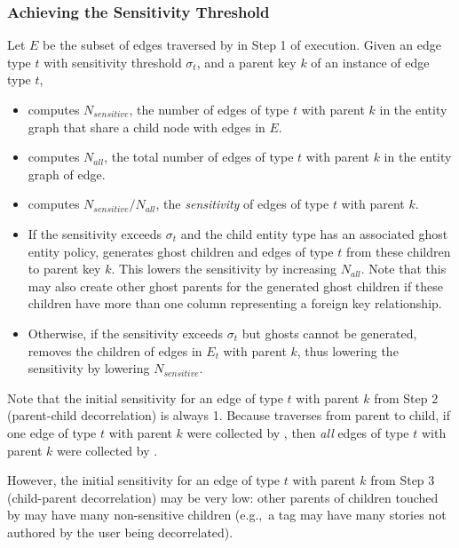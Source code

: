 \subsubsection{Achieving the Sensitivity Threshold}
\label{sensitivity_algo}
Let $E$ be the subset of edges traversed by \sys in Step 1 of execution. 
Given an edge type $t$ with sensitivity threshold $\sigma_t$, and a parent key $k$ of an instance of
edge type $t$, 
    \begin{itemize}
        \item \sys computes $N_{sensitive}$, the number of edges of type $t$ with parent $k$ in the entity graph that share 
            a child node with edges in $E$.
        \item \sys computes $N_{all}$, the total number of edges of type $t$ with parent $k$
            in the entity graph of edge.
        \item \sys computes $N_{sensitive}/N_{all}$, the \emph{sensitivity} of edges of type $t$
            with parent $k$.
        \item If the sensitivity exceeds $\sigma_t$ and the child entity type has an associated ghost entity policy, \sys
            generates ghost children and edges of type $t$ from these children to parent
            key $k$. This lowers the sensitivity by increasing $N_{all}$. Note that this may also
            create other ghost parents for the generated ghost children if these children have more
            than one column representing a foreign key relationship.
        \item Otherwise, if the sensitivity exceeds $\sigma_t$ but ghosts cannot be generated,
            \sys removes the children of edges in $E_t$ with parent $k$, thus lowering the
            sensitivity by lowering $N_{sensitive}$.
    \end{itemize}

Note that the initial sensitivity for an edge of type $t$ with parent $k$ from Step 2 (parent-child
decorrelation) is always 1. Because \sys traverses from parent to child, if one edge of type $t$ with
parent $k$ were collected by \sys, then \emph{all} edges of type $t$ with parent $k$ were collected
by \sys. 

However, the initial sensitivity for an edge of type $t$ with parent $k$ from Step 3 (child-parent
decorrelation) may be very low: other parents of children touched by \sys may have many
non-sensitive children (e.g.,\ a tag may have many stories not authored by the user being
decorrelated).

